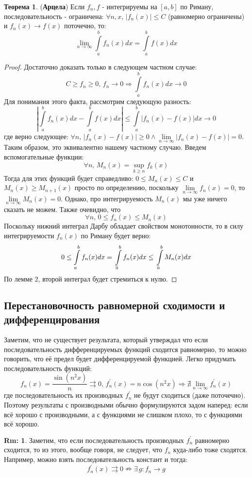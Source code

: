 \documentclass[12pt]{article}
\theoremstyle{definition}
\newtheorem{rem}{Rm:}
\newtheorem{theorem}{Теорема}
\newcommand{\ddint}[2]{\displaystyle\int\limits_{#1}^{#2}}
\newcommand{\uconv}[1]{\overset{#1}{\rightrightarrows}}
\def\lowint{\mkern3mu\underline{\vphantom{\intop}\mkern7mu}\mkern-10mu\int}
\begin{document}
\begin{theorem}(\textbf{Арцела})
	Если $f_n, f$ - интегрируемы на $[a,b]$ по Риману, последовательность - ограничена: $\forall n, x, \, |f_n(x)| \leq C$ (равномерно ограничены) и $f_n(x) \to f(x)$ поточечно, то:
	$$
		\lim\limits_{n \to \infty} \ddint{a}{b}f_n(x) dx = \ddint{a}{b}f(x)dx
	$$
\end{theorem}
\begin{proof}
	Достаточно доказать только в следующем частном случае:
	$$
		C \geq f_n \geq 0, \, f_n \to 0 \Rightarrow \ddint{a}{b}f_n(x)dx \to 0
	$$
	Для понимания этого факта, рассмотрим следующую разность:
	$$
		\left|\ddint{a}{b}f_n(x)dx - \ddint{a}{b}f(x)dx\right| \leq \ddint{a}{b}\left|f_n(x) - f(x)\right|dx \to 0 
	$$
	где верно следующее: $\forall n, \, |f_n(x) - f(x) | \geq 0 \wedge \lim\limits_{n \to \infty}|f_n(x) - f(x)| = 0$. Таким образом, это эквивалентно нашему частному случаю. Введем вспомогательные функции:
	$$
		\forall n, \, M_n(x) = \sup\limits_{k \geq n}f_k(x)
	$$
	Тогда для этих функций будет справедливо: $0 \leq M_n(x) \leq C$ и $M_n(x) \geq M_{n + 1}(x)$ просто по определению, поскольку $\lim\limits_{n \to \infty}f_n(x) = 0$, то $\lim\limits_{n \to \infty} M_n(x) = 0$. Однако, про интегрируемость $M_n(x)$ мы уже ничего сказать не можем. Также очевидно, что 
	$$
		\forall n, \, 0 \leq f_n(x) \leq M_n(x)
	$$
	Поскольку нижний интеграл Дарбу обладает свойством монотонности, то в силу интегрируемости $f_n(x)$ по Риману будет верно:
	$$
		0 \leq \ddint{a}{b}f_n(x)dx = \lowint\limits_{a}^{b}f_n(x)dx \leq \lowint\limits_{a}^{b}M_n(x)dx
	$$
	По лемме $2$, второй интеграл будет стремиться к нулю.
\end{proof}


\newpage

\subsection*{Перестановочность равномерной сходимости и дифференцирования}
Заметим, что не существует  результата, который утверждал что если последовательность дифференцируемых функций сходится равномерно, то можно говорить, что её предел будет дифференцируемой функцией. Легко придумать последовательность функций:
$$
	f_n(x) = \dfrac{\sin{(n^2 x)}}{n} \uconv{} 0, \, f^\prime_n(x) = n\cos{(n^2x)} \Rightarrow \nexists \lim\limits_{n \to \infty}f_n^\prime(x)
$$
где последовательность их производных $f_n^\prime$ не будут сходиться (даже поточечно). Поэтому результаты с производными обычно формулируются задом наперед: если всё хорошо с производными, а с функциями не слишком плохо, то с функциями всё хорошо.
\begin{rem}
	Заметим, что если последовательность производных $f_n^\prime$ равномерно сходится, то из этого, вообще говоря, не следует, что $f_n$ куда-либо тоже сходятся. Например, можно взять последовательность констант и тогда:
	$$
		f_n^\prime(x) \uconv{} 0 \nRightarrow \exists \, g \colon f_n \to g
	$$
\end{rem}
\end{document}
